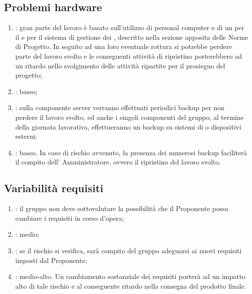 \subsection{Problemi hardware}
\begin{enumerate}
\item {}: gran parte del lavoro è basato sull'utilizzo di personal computer e di un  per il  e per il sistema di gestione dei , descritto nella sezione apposita delle Norme di Progetto. In seguito ad una loro eventuale rottura si potrebbe perdere parte del lavoro svolto e le conseguenti attività di ripristino porterebbero ad un ritardo nello svolgimento delle attività ripartite per il prosieguo del progetto;
\item {}: basso;
\item {}: sulla componente server verranno effettuati periodici backup per non perdere il lavoro svolto, ed anche i singoli componenti del gruppo, al termine della giornata lavorativa, effettueranno un backup su sistemi di  o dispositivi  esterni;
\item {}: basso. In caso di rischio avvenuto, la presenza dei numerosi backup faciliterà il compito dell' Amministratore, ovvero il ripristino del lavoro svolto.
\end{enumerate}

\subsection{Variabilità requisiti}
\begin{enumerate}
\item {}: il gruppo non deve sottovalutare la possibilità che il Proponente possa cambiare i requisiti in corso d'opera;
\item {}: medio;
\item {}: se il rischio si verifica, sarà compito del gruppo adeguarsi ai nuovi requisiti imposti dal Proponente;
\item {}: medio-alto. Un cambiamento sostanziale dei requisiti porterà ad un impatto alto di tale rischio e al conseguente ritardo nella consegna del prodotto finale.
\end{enumerate}


